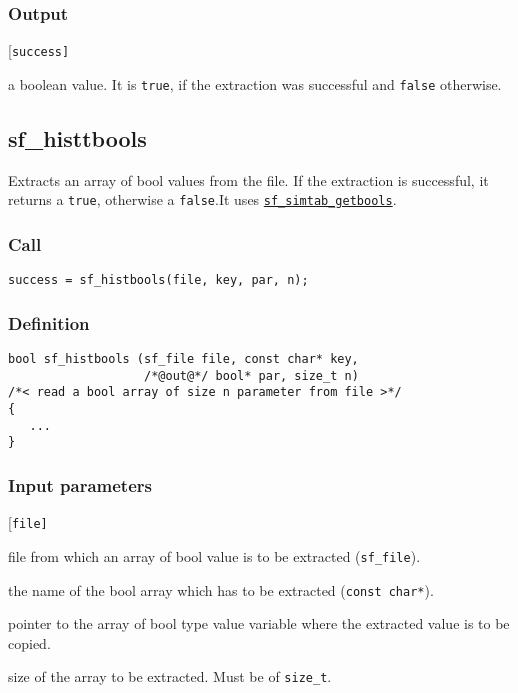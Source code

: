 \subsubsection*{Output}
\begin{desclist}{\tt }{\quad}[\tt success]
   \setlength\itemsep{0pt}
   \item[success] a boolean value. It is \texttt{true}, if the extraction was successful and \texttt{false} otherwise.
\end{desclist}




\subsection{{sf\_histtbools}}
Extracts an array of bool values from the file. If the extraction is successful, it returns a \texttt{true}, otherwise a \texttt{false}.It uses \hyperref[sec:sf_simtab_getbools]{\texttt{sf\_simtab\_getbools}}.

\subsubsection*{Call}
\begin{verbatim}success = sf_histbools(file, key, par, n);\end{verbatim}

\subsubsection*{Definition}
\begin{verbatim}
bool sf_histbools (sf_file file, const char* key,
                   /*@out@*/ bool* par, size_t n) 
/*< read a bool array of size n parameter from file >*/ 
{
   ...
}
\end{verbatim}

\subsubsection*{Input parameters}
\begin{desclist}{\tt }{\quad}[\tt file]
   \setlength\itemsep{0pt}
   \item[file] file from which an array of bool  value is to be extracted (\texttt{sf\_file}).
   \item[key]  the name of the bool array which has to be extracted (\texttt{const char*}).
   \item[par]  pointer to the array of bool type value variable where the extracted value is to be copied. 
   \item[n]    size of the array to be extracted. Must be of \texttt{size\_t}.
\end{desclist}


